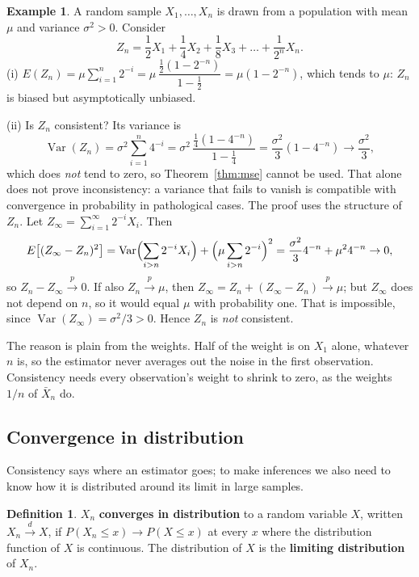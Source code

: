 \documentclass[11pt,a4paper]{article}
\numberwithin{equation}{section}
\DeclareMathOperator{\Var}{Var}
\theoremstyle{definition}
\newtheorem{defn}[thm]{Definition}
\newtheorem{exa}[thm]{Example}
\begin{document}
\begin{exa}
\label{ex:zest}
A random sample $X_1, \dots, X_n$ is drawn from a population with mean $\mu$ and variance $\sigma^2 > 0$. Consider
\[
Z_n = \frac12X_1 + \frac14X_2 + \frac18X_3 + \dots + \frac{1}{2^n}X_n .
\]
(i) $E(Z_n) = \mu\sum_{i=1}^n 2^{-i} = \mu\,\dfrac{\frac12(1 - 2^{-n})}{1 - \frac12} = \mu(1 - 2^{-n})$, which tends to $\mu$: $Z_n$ is biased but
asymptotically unbiased.

(ii) Is $Z_n$ consistent? Its variance is
\[
\Var(Z_n) = \sigma^2\sum_{i=1}^n 4^{-i} = \sigma^2\,\frac{\frac14(1 - 4^{-n})}{1 - \frac14} = \frac{\sigma^2}{3}(1 - 4^{-n}) \to \frac{\sigma^2}{3} ,
\]
which does \emph{not} tend to zero, so Theorem~\ref{thm:mse} cannot be used. That alone does not prove inconsistency: a variance that fails to vanish is
compatible with convergence in probability in pathological cases. The proof uses the structure of $Z_n$. Let
$Z_\infty = \sum_{i=1}^\infty 2^{-i}X_i$. Then
\[
E\bigl[(Z_\infty - Z_n)^2\bigr] = \Var\Bigl(\sum_{i>n}2^{-i}X_i\Bigr) + \Bigl(\mu\sum_{i>n}2^{-i}\Bigr)^2 = \frac{\sigma^2}{3}4^{-n} + \mu^2 4^{-n} \to 0 ,
\]
so $Z_n - Z_\infty \xrightarrow{p} 0$. If also $Z_n \xrightarrow{p} \mu$, then $Z_\infty = Z_n + (Z_\infty - Z_n) \xrightarrow{p} \mu$; but $Z_\infty$ does not depend on
$n$, so it would equal $\mu$ with probability one. That is impossible, since $\Var(Z_\infty) = \sigma^2/3 > 0$. Hence $Z_n$ is \emph{not} consistent.

The reason is plain from the weights. Half of the weight is on $X_1$ alone, whatever $n$ is, so the estimator never averages out the noise in
the first observation. Consistency needs every observation's weight to shrink to zero, as the weights $1/n$ of $\bar X_n$ do.
\end{exa}

\subsection{Convergence in distribution}
\label{ssec:dist}

Consistency says where an estimator goes; to make inferences we also need to know how it is distributed around its limit in large samples.

\begin{defn}
$X_n$ \textbf{converges in distribution} to a random variable $X$, written $X_n \xrightarrow{d} X$, if $P(X_n \leq x) \to P(X \leq x)$ at every $x$
where the distribution function of $X$ is continuous. The distribution of $X$ is the \textbf{limiting distribution} of $X_n$.
\end{defn}
\end{document}
